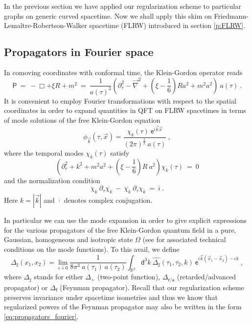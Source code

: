 \documentclass[11pt]{book}
\newcommand{\abs}[1]{\left|#1\right|}
\newcommand{\Psf}{\mathsf{P}}
\newcommand{\asf}{\mathsf{a}}
\newcommand{\dsf}{\mathsf{d}}
\newcommand{\esf}{\mathsf{e}}
\newcommand{\fsf}{\mathsf{f}}
\newcommand{\rsf}{\mathsf{r}}
\theoremstyle{break}
\begin{document}
In the previous section we have applied our regularization scheme to particular graphs on generic curved spacetime. Now we shall apply this skim on Friedmann-Lemaître-Robertson-Walker spacetime (FLRW) introduced in section \ref{p:FLRW}.


\subsection{Propagators in Fourier space}


In comoving coordinates with conformal time, the Klein-Gordon operator reads
%
\begin{equation*}
\Psf \ = \ - \Box + \xi R + m^2 \ = \ \frac{1}{a(\tau)^3} \left(\partial^2_\tau-\vec{\nabla}^2 + \left(\xi-\frac16\right)R a^2+m^2a^2\right) \ a(\tau) \ .
\end{equation*}
%
It is convenient to employ Fourier transformations with respect to the spatial coordinates in order to expand quantities in QFT on FLRW spacetimes in terms of mode solutions of the free Klein-Gordon equation
%
\begin{equation*}
\phi_{\vec{k}}(\tau,\vec{x}) = \frac{\chi_k(\tau) \ \esf^{i\vec{k}\vec{x}}}{(2\pi)^{\frac32} \ a(\tau)} \ , 
\end{equation*}
%
where the temporal modes $\chi_k(\tau)$ satisfy
%
\begin{equation}
\left(\partial^2_\tau + k^2 + m^2 a^2 + \left( \xi - \frac16 \right) R \ a^2 \right) \chi_k(\tau) \ = \ 0
\label{eq:modes}
\end{equation}
%
and the normalization condition
%
\begin{equation}
\chi_k \ \partial_\tau \overline{\chi_k} \ - \ \overline{\chi_k} \ \partial_\tau{\chi_k} \ = \ i \ .
\label{eq:modes_normal}
\end{equation}
%
Here $k = \abs{\vec{k}}$ and $\overline{\cdot}$ denotes complex conjugation.


In particular we can use the mode expansion in order to give explicit expressions for the various propagators of the free Klein-Gordon quantum field in a pure, Gaussian, homogeneous and isotropic state $\Omega$ (see \cite{PINAMONTI_2011,ZSCHOCHE_2014}
for associated technical conditions on the mode functions). To this avail, we define
%
\begin{equation}
\Delta_\sharp(x_1,x_2) = \lim_{\epsilon\downarrow 0} \frac{1}{8\pi^3 \ a(\tau_1) \ a(\tau_2)} \int_{\mathbb{R}^3} \dsf^3k \ \widehat{\Delta_\sharp}(\tau_1,\tau_2,k) \ \esf^{i\vec{k}(\vec{x}_1-\vec{x}_2)-\epsilon k} \ ,
\label{eq:propagators_fourier}
\end{equation}
%
where $\Delta_\sharp$ stands for either $\Delta_+$ (two-point function), $\Delta_{\rsf/\asf}$ (retarded/advanced propagator) or $\Delta_\fsf$ (Feynman propagator). Recall that our regularization scheme preserves invariance under spacetime isometries and thus we know that regularized powers of the Feynman propagator may also be written in the form \eqref{eq:propagators_fourier}.
\end{document}

